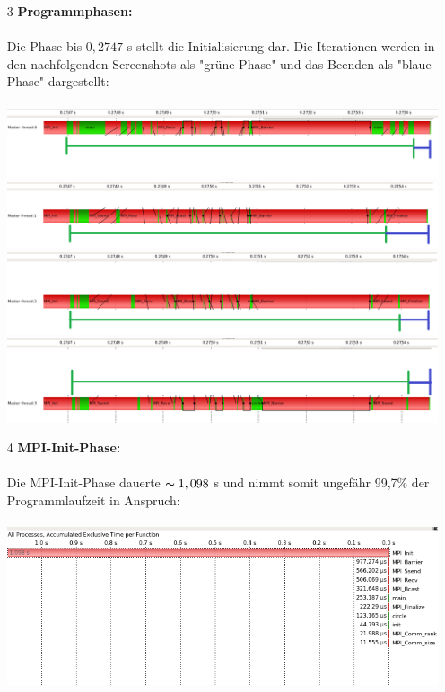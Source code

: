 \documentclass[a4paper,10pt]{article}
\begin{document}
\begin{itemize}
    \item[3]\textbf{Programmphasen:}\\\\
    Die Phase bis $0,2747$ s stellt die Initialisierung dar. Die Iterationen werden in den nachfolgenden Screenshots als "grüne Phase" und das Beenden als "blaue Phase" dargestellt:\\\\
    \includegraphics[width=14cm]{Init_1.png}\\
    \includegraphics[width=14cm]{Init_2.png}\\
    \includegraphics[width=14cm]{Init_3.png}\\
    \includegraphics[width=14cm]{Init_4.png}\\
    \item[4] \textbf{MPI-Init-Phase:}\\\\
    Die MPI-Init-Phase dauerte $\thicksim 1,098$ s und nimmt somit ungefähr 99,7\% der Programmlaufzeit in Anspruch:\\\\
    \includegraphics[width=14cm]{MPI_Init.png}
\end{itemize}
\newpage
\end{document}
